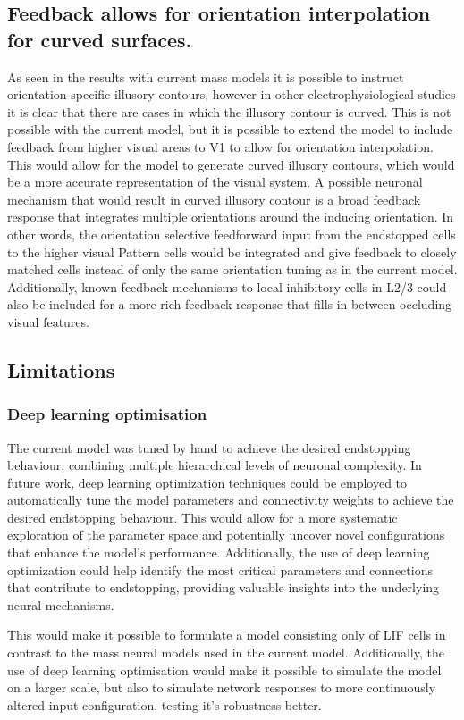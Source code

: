 \documentclass[12pt]{article}
\begin{document}
\subsection{Feedback allows for orientation interpolation for curved surfaces.}
As seen in the results with current mass models it is possible to instruct orientation specific illusory contours, however in other electrophysiological studies it is clear that there are cases in which the illusory contour is curved. This is not possible with the current model, but it is possible to extend the model to include feedback from higher visual areas to V1 to allow for orientation interpolation. This would allow for the model to generate curved illusory contours, which would be a more accurate representation of the visual system. A possible neuronal mechanism that would result in curved illusory contour is a broad feedback response that integrates multiple orientations around the inducing orientation. In other words, the orientation selective feedforward input from the endstopped cells to the higher visual Pattern cells would be integrated and give feedback to closely matched cells instead of only the same orientation tuning as in the current model. Additionally, known feedback mechanisms to local inhibitory cells in L2/3 could also be included for a more rich feedback response that fills in between occluding visual features.
\subsection{Limitations}
\subsubsection{Deep learning optimisation}
The current model was tuned by hand to achieve the desired endstopping behaviour, combining multiple hierarchical levels of neuronal complexity. In future work, deep learning optimization techniques could be employed to automatically tune the model parameters and connectivity weights to achieve the desired endstopping behaviour. This would allow for a more systematic exploration of the parameter space and potentially uncover novel configurations that enhance the model's performance. Additionally, the use of deep learning optimization could help identify the most critical parameters and connections that contribute to endstopping, providing valuable insights into the underlying neural mechanisms. 

This would make it possible to formulate a model consisting only of LIF cells in contrast to the mass neural models used in the current model. Additionally, the use of deep learning optimisation would make it possible to simulate the model on a larger scale, but also to simulate network responses to more continuously altered input configuration, testing it's robustness better.



\newpage
\printbibliography
\end{document}
